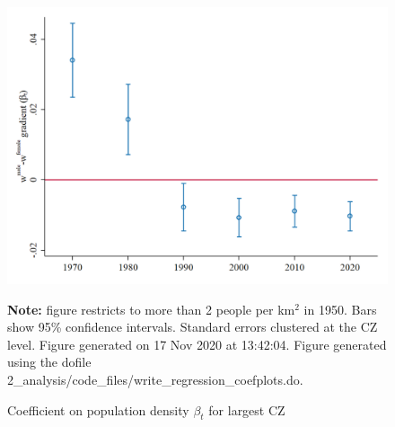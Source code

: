 \begin{figure}[!h]
\centering
\caption{Coefficient on population density $ \beta_t $ for largest CZ}
\includegraphics[width=1\textwidth]{../2_analysis/output/figures/baseline_large_l_czone_density_full_time}
\par \begin{minipage}[h]{\textwidth}{\tiny\textbf{Note:} figure restricts to more than 2 people per km$^2$ in 1950. Bars show 95\% confidence intervals. Standard errors clustered at the CZ level. Figure generated on 17 Nov 2020 at 13:42:04. Figure generated using the dofile 2\_analysis/code\_files/write\_regression\_coefplots.do.}\end{minipage}
\end{figure}

